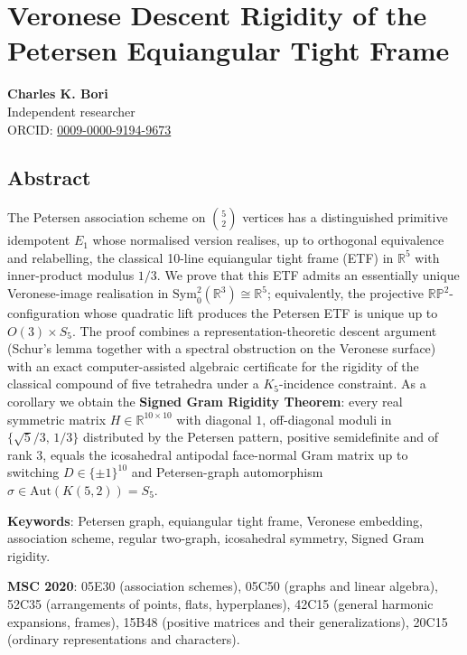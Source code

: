 \documentclass[
]{article}
\author{}
\date{}
\begin{document}
\section{Veronese Descent Rigidity of the Petersen Equiangular Tight
Frame}\label{veronese-descent-rigidity-of-the-petersen-equiangular-tight-frame}

\textbf{Charles K. Bori}\\
Independent researcher\\
ORCID: \href{https://orcid.org/0009-0000-9194-9673}{0009-0000-9194-9673}

\subsection{Abstract}\label{abstract}

The Petersen association scheme on \(\binom{5}{2}\) vertices has a
distinguished primitive idempotent \(E_1\) whose normalised version
realises, up to orthogonal equivalence and relabelling, the classical
10-line equiangular tight frame (ETF) in \(\mathbb{R}^5\) with
inner-product modulus \(1/3\). We prove that this ETF admits an
essentially unique Veronese-image realisation in
\(\mathrm{Sym}^2_0(\mathbb{R}^3) \cong \mathbb{R}^5\); equivalently, the
projective \(\mathbb{RP}^2\)-configuration whose quadratic lift produces
the Petersen ETF is unique up to \(O(3) \times S_5\). The proof combines
a representation-theoretic descent argument (Schur's lemma together with
a spectral obstruction on the Veronese surface) with an exact
computer-assisted algebraic certificate for the rigidity of the
classical compound of five tetrahedra under a \(K_5\)-incidence
constraint. As a corollary we obtain the \textbf{Signed Gram Rigidity
Theorem}: every real symmetric matrix \(H \in \mathbb{R}^{10\times 10}\)
with diagonal \(1\), off-diagonal moduli in \(\{\sqrt{5}/3,\,1/3\}\)
distributed by the Petersen pattern, positive semidefinite and of rank
\(3\), equals the icosahedral antipodal face-normal Gram matrix up to
switching \(D \in \{\pm 1\}^{10}\) and Petersen-graph automorphism
\(\sigma \in \mathrm{Aut}(K(5,2)) = S_5\).

\textbf{Keywords}: Petersen graph, equiangular tight frame, Veronese
embedding, association scheme, regular two-graph, icosahedral symmetry,
Signed Gram rigidity.

\textbf{MSC 2020}: 05E30 (association schemes), 05C50 (graphs and linear
algebra), 52C35 (arrangements of points, flats, hyperplanes), 42C15
(general harmonic expansions, frames), 15B48 (positive matrices and
their generalizations), 20C15 (ordinary representations and characters).
\end{document}
